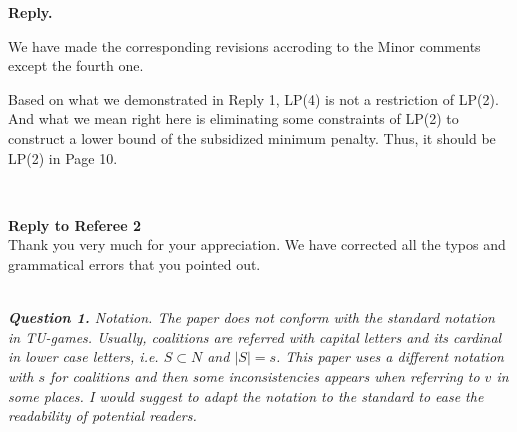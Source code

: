 \documentclass[11pt]{article}
\begin{document}
\noindent \textbf{Reply.}

We have made the corresponding revisions accroding to the Minor comments except the fourth one.

Based on what we demonstrated in Reply 1, LP(4) is not a restriction of LP(2). And what we mean right here is eliminating some constraints of LP(2) to construct a lower bound of the subsidized minimum penalty. Thus, it should be LP(2) in Page 10.


%
%

%
%
%
\\[4mm]

\newpage

\noindent \textbf{\large Reply to Referee 2}
\\[3mm]
Thank you very much for your appreciation.
We have corrected all the typos and grammatical errors that you pointed out.

\\[4mm]
%
%
%
\noindent \textit{\textbf{Question 1.}
Notation. The paper does not conform with the standard notation in
TU-games. Usually, coalitions are referred with capital letters and its
cardinal in lower case letters, i.e. $S \subset N$ and $|S| = s$. This paper uses a different notation with $s$ for coalitions and then some inconsistencies
appears when referring to $v$ in some places. I would suggest to adapt
the notation to the standard to ease the readability of potential readers.}
\end{document}
